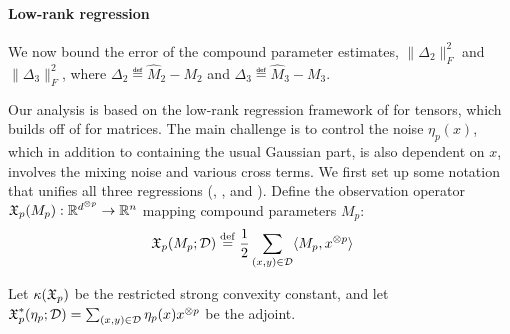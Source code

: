 \paragraph{Low-rank regression}
\vspace{-0.5em}
We now bound the error of
the compound parameter estimates,
$\|\Delta_2\|_F^2$ and $\|\Delta_3\|_F^2$,
where $\Delta_2 \eqdef \hat M_2 - M_2$
and $\Delta_3 \eqdef \hat M_3 - M_3$.

Our analysis is based on the low-rank regression framework of
\citet{Tomioka2011} for tensors, which builds off of
\citet{NegahbanWainwright2009} for matrices.
The main challenge is to control the noise $\eta_p(x)$,
which in addition to containing the usual Gaussian part, is also dependent on
$x$, involves the mixing noise and various cross terms.
We first set up some notation that unifies all three regressions (, , and ).
Define the observation operator $\operatorname{\mathfrak{X}}_p(M_p) : \mathbb{R}^{d^{\otimes p}} \to \mathbb{R}^{n}$
mapping compound parameters $M_p$:
\begin{align}
\operatorname{\mathfrak{X}}_p(M_p; \mathcal{D}) &\stackrel{\rm def}{=} \frac12 \sum_{(x,y) \in \mathcal{D}} \langle M_p, x^{\otimes p} \rangle
\end{align}

Let $\kappa(\operatorname{\mathfrak{X}}_p)$ be the restricted strong convexity constant,
and let $\operatorname{\mathfrak{X}}^*_p(\eta_p; \mathcal{D}) = \sum_{(x,y) \in \mathcal{D}} \eta_p(x) x^{\otimes p}$
be the adjoint.





